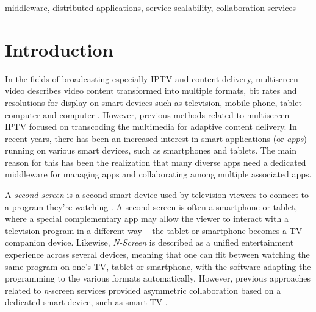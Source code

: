 \documentclass[conference]{IEEEtran}
\begin{document}
    \begin{IEEEkeywords}
    middleware, distributed applications, service scalability, collaboration services
    \end{IEEEkeywords}

\section{Introduction}
In the fields of broadcasting especially IPTV and content delivery, multiscreen video describes video content transformed into multiple formats, bit rates and resolutions for display on smart devices such as television, mobile phone, tablet computer and computer \cite{Lucent2011}.
However, previous methods related to multiscreen IPTV focused on transcoding the multimedia for adaptive content delivery. 
In recent years, there has been an increased interest in smart applications (or \textit{apps}) running on various smart devices, such as smartphones and tablets. 
The main reason for this has been the realization that many diverse apps need a dedicated middleware for managing apps and collaborating among multiple associated apps. 

A \textit{second screen} is a second smart device used by television viewers to connect to a program they're watching \cite{Nandakumar:2014}. 
A second screen is often a smartphone or tablet, where a special complementary app may allow the viewer to interact with a television program in a different way -- the tablet or smartphone becomes a TV companion device. 
Likewise, \textit{N-Screen} is described as a unified entertainment experience across several devices, meaning that one can flit between watching the same program on one's TV, tablet or smartphone, with the software adapting the programming to the various formats automatically. However, previous approaches related to \textit{n}-screen services provided asymmetric collaboration based on a dedicated smart device, such as smart TV \cite{samsung:2014}. 
\end{document}
